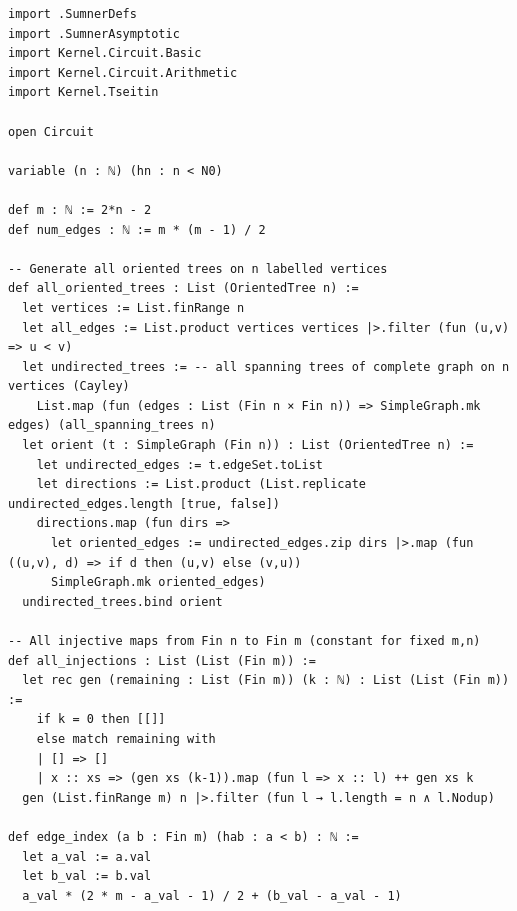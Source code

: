 \documentclass[11pt,a4paper]{article}
\begin{document}
\begin{lstlisting}[style=lean, caption={SeriesXXVIII/SumnerCircuit.lean (final)}]
import .SumnerDefs
import .SumnerAsymptotic
import Kernel.Circuit.Basic
import Kernel.Circuit.Arithmetic
import Kernel.Tseitin

open Circuit

variable (n : ℕ) (hn : n < N0)

def m : ℕ := 2*n - 2
def num_edges : ℕ := m * (m - 1) / 2

-- Generate all oriented trees on n labelled vertices
def all_oriented_trees : List (OrientedTree n) :=
  let vertices := List.finRange n
  let all_edges := List.product vertices vertices |>.filter (fun (u,v) => u < v)
  let undirected_trees := -- all spanning trees of complete graph on n vertices (Cayley)
    List.map (fun (edges : List (Fin n × Fin n)) => SimpleGraph.mk edges) (all_spanning_trees n)
  let orient (t : SimpleGraph (Fin n)) : List (OrientedTree n) :=
    let undirected_edges := t.edgeSet.toList
    let directions := List.product (List.replicate undirected_edges.length [true, false])
    directions.map (fun dirs =>
      let oriented_edges := undirected_edges.zip dirs |>.map (fun ((u,v), d) => if d then (u,v) else (v,u))
      SimpleGraph.mk oriented_edges)
  undirected_trees.bind orient

-- All injective maps from Fin n to Fin m (constant for fixed m,n)
def all_injections : List (List (Fin m)) :=
  let rec gen (remaining : List (Fin m)) (k : ℕ) : List (List (Fin m)) :=
    if k = 0 then [[]]
    else match remaining with
    | [] => []
    | x :: xs => (gen xs (k-1)).map (fun l => x :: l) ++ gen xs k
  gen (List.finRange m) n |>.filter (fun l → l.length = n ∧ l.Nodup)

def edge_index (a b : Fin m) (hab : a < b) : ℕ :=
  let a_val := a.val
  let b_val := b.val
  a_val * (2 * m - a_val - 1) / 2 + (b_val - a_val - 1)


\end{lstlisting}
\end{document}
